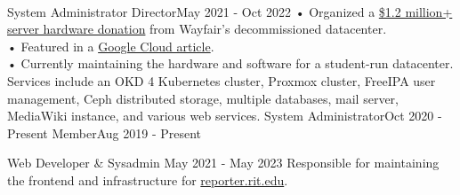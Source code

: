 \vspace{1.5pt} %


\cvtag{\LaTeX}
\medskip
\\

\vspace{6pt} %

{System Administrator Director}{May 2021 - Oct 2022}
{•  Organized a \href{https://www.rit.edu/news/wayfair-gifts-850000-servers-rits-computer-science-house}{\$1.2 million+ server hardware donation} from Wayfair's decommissioned datacenter.\\ \smallskip
  •  Featured in a \href{https://cloud.google.com/blog/transform/wayfair-server-donation-mass-open-cloud-rit-student-innovation-johonnot}{Google Cloud article}.\\ \smallskip
  •  Currently maintaining the hardware and software for a student-run datacenter. Services include an OKD 4 Kubernetes cluster, Proxmox cluster, FreeIPA user management, Ceph distributed storage, multiple databases, mail server, MediaWiki instance, and various web services.}
{System Administrator}{Oct 2020 - Present}
{Member}{Aug 2019 - Present}

{Web Developer \& Sysadmin} {May 2021 - May 2023}
{Responsible for maintaining the frontend and infrastructure for \href{https://reporter.rit.edu}{reporter.rit.edu}}.
